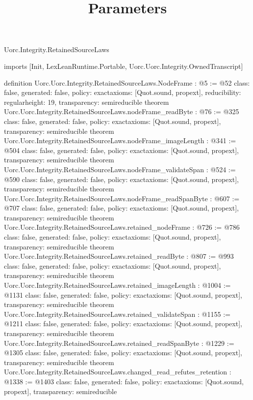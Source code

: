 \begin{lexlean}{Uorc.Integrity.RetainedSourceLaws}
\title{Parameters}
\begin{coremodule}
imports [Init, LexLeanRuntime.Portable, Uorc.Uorc.Integrity.OwnedTranscript]

definition Uorc.Uorc.Integrity.RetainedSourceLaws.NodeFrame : @5 := @52 {
  class: false,
  generated: false,
  policy: exact{axioms: [Quot.sound, propext]},
  reducibility: regular{height: 19},
  transparency: semireducible
}
theorem Uorc.Uorc.Integrity.RetainedSourceLaws.nodeFrame_readByte : @76 := @325 {
  class: false,
  generated: false,
  policy: exact{axioms: [Quot.sound, propext]},
  transparency: semireducible
}
theorem Uorc.Uorc.Integrity.RetainedSourceLaws.nodeFrame_imageLength : @341 := @504 {
  class: false,
  generated: false,
  policy: exact{axioms: [Quot.sound, propext]},
  transparency: semireducible
}
theorem Uorc.Uorc.Integrity.RetainedSourceLaws.nodeFrame_validateSpan : @524 := @590 {
  class: false,
  generated: false,
  policy: exact{axioms: [Quot.sound, propext]},
  transparency: semireducible
}
theorem Uorc.Uorc.Integrity.RetainedSourceLaws.nodeFrame_readSpanByte : @607 := @707 {
  class: false,
  generated: false,
  policy: exact{axioms: [Quot.sound, propext]},
  transparency: semireducible
}
theorem Uorc.Uorc.Integrity.RetainedSourceLaws.retained_nodeFrame : @726 := @786 {
  class: false,
  generated: false,
  policy: exact{axioms: [Quot.sound, propext]},
  transparency: semireducible
}
theorem Uorc.Uorc.Integrity.RetainedSourceLaws.retained_readByte : @807 := @993 {
  class: false,
  generated: false,
  policy: exact{axioms: [Quot.sound, propext]},
  transparency: semireducible
}
theorem Uorc.Uorc.Integrity.RetainedSourceLaws.retained_imageLength : @1004 := @1131 {
  class: false,
  generated: false,
  policy: exact{axioms: [Quot.sound, propext]},
  transparency: semireducible
}
theorem Uorc.Uorc.Integrity.RetainedSourceLaws.retained_validateSpan : @1155 := @1211 {
  class: false,
  generated: false,
  policy: exact{axioms: [Quot.sound, propext]},
  transparency: semireducible
}
theorem Uorc.Uorc.Integrity.RetainedSourceLaws.retained_readSpanByte : @1229 := @1305 {
  class: false,
  generated: false,
  policy: exact{axioms: [Quot.sound, propext]},
  transparency: semireducible
}
theorem Uorc.Uorc.Integrity.RetainedSourceLaws.changed_read_refutes_retention : @1338 := @1403 {
  class: false,
  generated: false,
  policy: exact{axioms: [Quot.sound, propext]},
  transparency: semireducible
}


\end{coremodule}
\end{lexlean}
